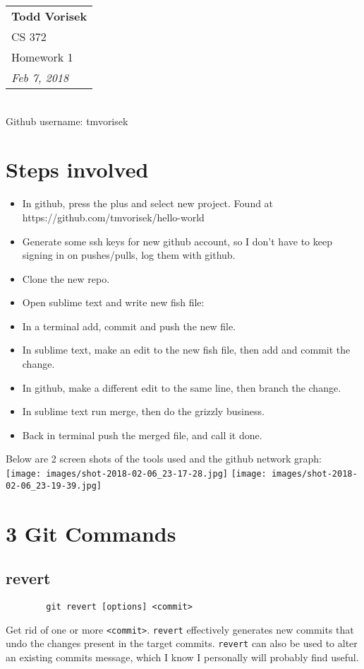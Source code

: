 \documentclass{article}
\begin{document}
  \null\hfill\begin{tabular}[t]{l@{}}
  \textbf{Todd Vorisek} \\
  CS 372 \\
  Homework 1\\
  \textit{Feb 7, 2018} \\
  \end{tabular}\\

  Github username: tmvorisek
  \section*{Steps involved}
    \begin{itemize}
      \item In github, press the plus and select new project. Found at https://github.com/tmvorisek/hello-world
      \item Generate some ssh keys for new github account, so I don't have to keep signing in on pushes/pulls, log them with github.  
      \item Clone the new repo. 
      \item Open sublime text and write new fish file:\\ 
      \item In a terminal add, commit and push the new file.
      \item In sublime text, make an edit to the new fish file, then add and commit the change.
      \item In github, make a different edit to the same line, then branch the change.
      \item In sublime text run merge, then do the grizzly business.
      \item Back in terminal push the merged file, and call it done.
    \end{itemize}
    Below are 2  screen shots of the tools used and the github network graph:\\
    \texttt{[image: images/shot-2018-02-06\_23-17-28.jpg]}
    \texttt{[image: images/shot-2018-02-06\_23-19-39.jpg]}

  \section*{3 Git Commands}
    \subsection{revert}
      \begin{lstlisting} 
        git revert [options] <commit>\end{lstlisting}
      Get rid of one or more \verb|<commit>|. \verb|revert| effectively generates new commits that undo the changes present in the target commits. \verb|revert| can also be used to alter an existing commits message, which I know I personally will probably find useful. \\
\end{document}
